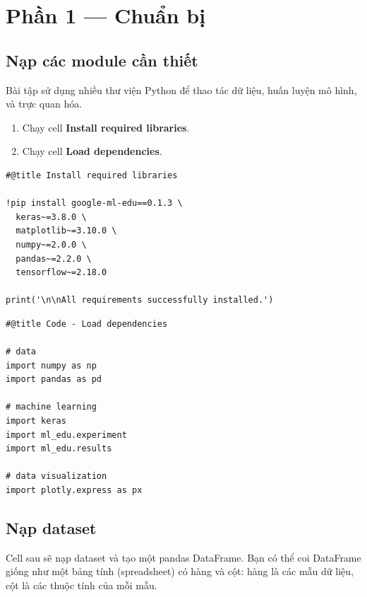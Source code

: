 \documentclass[12pt,a4paper]{article}
\begin{document}
\section{Phần 1 --- Chuẩn bị}

\subsection{Nạp các module cần thiết}

\begin{dongco}[title={Vì sao cần nhiều thư viện?}]
Bài tập sử dụng nhiều thư viện Python để thao tác dữ liệu, huấn luyện mô hình, và trực quan hóa.
\end{dongco}

\begin{phuongphap}[title={Hướng dẫn}]
\begin{enumerate}
  \item Chạy cell \textbf{Install required libraries}.
  \item Chạy cell \textbf{Load dependencies}.
\end{enumerate}
\end{phuongphap}

\begin{lstlisting}
#@title Install required libraries

!pip install google-ml-edu==0.1.3 \
  keras~=3.8.0 \
  matplotlib~=3.10.0 \
  numpy~=2.0.0 \
  pandas~=2.2.0 \
  tensorflow~=2.18.0

print('\n\nAll requirements successfully installed.')
\end{lstlisting}

\begin{lstlisting}
#@title Code - Load dependencies

# data
import numpy as np
import pandas as pd

# machine learning
import keras
import ml_edu.experiment
import ml_edu.results

# data visualization
import plotly.express as px
\end{lstlisting}

\subsection{Nạp dataset}

\begin{phuongphap}[title={Đọc CSV vào DataFrame}]
Cell sau sẽ nạp dataset và tạo một pandas DataFrame.
Bạn có thể coi DataFrame giống như một bảng tính (spreadsheet) có hàng và cột:
hàng là các mẫu dữ liệu, cột là các thuộc tính của mỗi mẫu.
\end{phuongphap}
\end{document}
